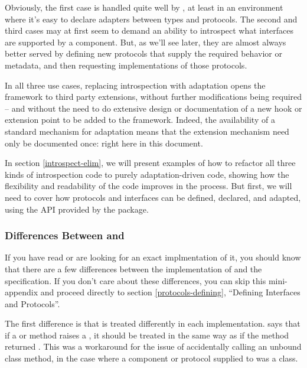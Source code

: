 Obviously, the first case is handled quite well by , at
least in an environment where it's easy to declare adapters between types and
protocols.  The second and third cases may at first seem to demand an ability
to introspect what interfaces are supported by a component.  But, as we'll
see later, they are almost always better served by defining new protocols
that supply the required behavior or metadata, and then requesting
implementations of those protocols.

In all three use cases, replacing introspection with adaptation opens the
framework to third party extensions, without further modifications being
required -- and without the need to do extensive design or documentation
of a new hook or extension point to be added to the framework.  Indeed,
the availability of a standard mechanism for adaptation means that the
extension mechanism need only be documented once: right here in this
document.

In section \ref{introspect-elim}, we will present examples of how to
refactor all three kinds of introspection code to purely adaptation-driven
code, showing how the flexibility and readability of the code improves in the
process.  But first, we will need to cover how protocols and interfaces can
be defined, declared, and adapted, using the API provided by the
 package.



\subsubsection{Differences Between  and }

If you have read  or are looking for an exact implmentation of it,
you should know that there are a few differences between the 
implementation of  and the  specification.  If you
don't care about these differences, you can skip this mini-appendix and
proceed directly to section \ref{protocols-defining}, ``Defining Interfaces
and Protocols''.

The first difference is that  is treated differently in
each implementation.   says that if a  or
 method raises a , it should be
treated in the same way as if the method returned .  This was
a workaround for the issue of accidentally calling an unbound class
method, in the case where a component or protocol supplied to
 was a class.

